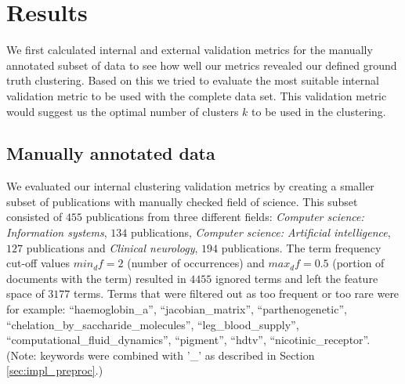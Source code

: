 \chapter{Results}
\label{chapter:results}

We first calculated internal and external validation metrics for 
the manually annotated subset of data to see how well our metrics 
revealed our defined ground truth clustering. Based on this we tried 
to evaluate the most suitable internal validation metric to be used 
with the complete data set. This validation metric would suggest us
the optimal number of clusters $k$ to be used in the clustering.

\section{Manually annotated data}
We evaluated our internal clustering validation metrics by 
creating a smaller subset of publications with manually
checked field of science. This subset consisted of 
$455$ publications from three different fields:
\emph{Computer science: Information systems}, $134$ publications,
\emph{Computer science: Artificial intelligence}, $127$ publications
and \emph{Clinical neurology}, $194$ publications.
The term frequency cut-off values $min_df=2$ (number of occurrences) 
and $max_df=0.5$ (portion of documents with the term) resulted
in $4455$ ignored terms and left the feature space of $3177$ terms. 
Terms that were filtered out as too frequent or too rare were for 
example: 
``haemoglobin\_a'', ``jacobian\_matrix'', 
``parthenogenetic'', ``chelation\_by\_saccharide\_molecules'', 
``leg\_blood\_supply'', ``computational\_fluid\_dynamics'', 
``pigment'', ``hdtv'', ``nicotinic\_receptor''. 
\linebreak
(Note: keywords were
combined with '\_' as described in Section \ref{sec:impl_preproc}.)

